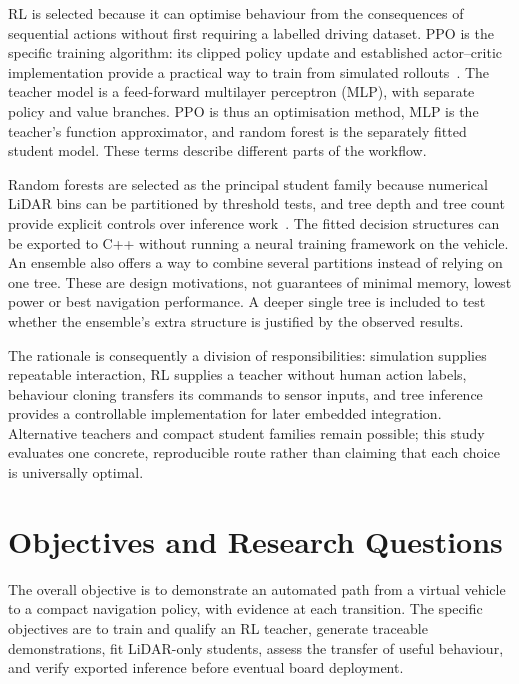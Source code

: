 RL is selected because it can optimise behaviour from the consequences of
sequential actions without first requiring a labelled driving dataset. PPO is
the specific training algorithm: its clipped policy update and established
actor--critic implementation provide a practical way to train from simulated
rollouts~\cite{schulman2017ppo,raffin2021sb3}. The teacher model is a feed-forward
multilayer perceptron (MLP), with separate policy and value branches. PPO is thus
an optimisation method, MLP is the teacher's function approximator, and random
forest is the separately fitted student model. These terms describe different
parts of the workflow.

Random forests are selected as the principal student family because numerical
LiDAR bins can be partitioned by threshold tests, and tree depth and tree count
provide explicit controls over inference work~\cite{breiman2001random,sklearnForest}.
The fitted decision structures can be exported to C++ without running a neural
training framework on the vehicle. An ensemble also offers a way to combine
several partitions instead of relying on one tree. These are design motivations,
not guarantees of minimal memory, lowest power or best navigation performance.
A deeper single tree is included to test whether the ensemble's extra structure
is justified by the observed results.

The rationale is consequently a division of responsibilities: simulation supplies
repeatable interaction, RL supplies a teacher without human action labels,
behaviour cloning transfers its commands to sensor inputs, and tree inference
provides a controllable implementation for later embedded integration. Alternative
teachers and compact student families remain possible; this study evaluates one
concrete, reproducible route rather than claiming that each choice is universally
optimal.

\section{Objectives and Research Questions}
The overall objective is to demonstrate an automated path from a virtual vehicle
to a compact navigation policy, with evidence at each transition. The specific
objectives are to train and qualify an RL teacher, generate traceable demonstrations,
fit LiDAR-only students, assess the transfer of useful behaviour, and verify
exported inference before eventual board deployment.

